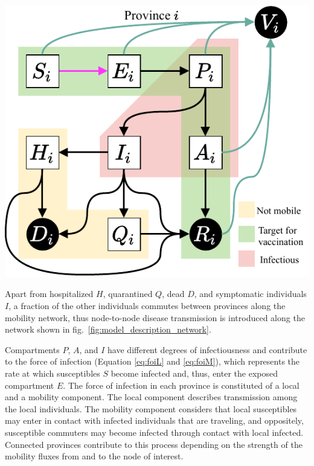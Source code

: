 \begin{marginfigure}
\centering
\includegraphics{fig_italy-ocp/figures/OCPItalydrawio2.pdf}
    \label{fig:model_description_diag}
\end{marginfigure}


Apart from hospitalized $H$, quarantined $Q$, dead $D$, and symptomatic individuals $I$, a fraction of the other individuals commutes between provinces along the mobility network, thus node-to-node disease transmission is introduced along the network shown in fig.~\ref{fig:model_description_network}.

Compartments $P$, $A$, and $I$ have different degrees of infectiousness and contribute to the force of infection (Equation \eqref{eq:foiL} and \eqref{eq:foiM}), which represents the rate at which susceptibles $S$ become infected and, thus, enter the exposed compartment $E$. The force of infection in each province is constituted of a local and a mobility component. The local component describes transmission among the local individuals. The mobility component considers that local susceptibles may enter in contact with infected individuals that are traveling, and oppositely, susceptible commuters may become infected through contact with local infected. Connected provinces contribute to this process depending on the strength of the mobility fluxes from and to the node of interest.

